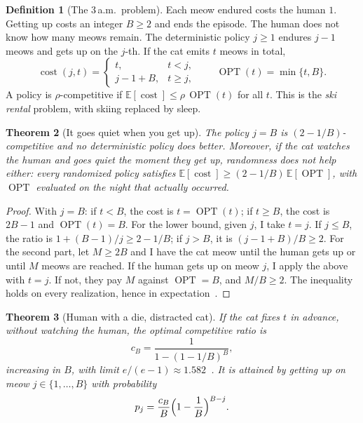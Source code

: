 \documentclass[11pt,a4paper]{article}
\theoremstyle{plain}
\newtheorem{teorema}{Theorem}[section]
\theoremstyle{definition}
\newtheorem{definicion}[teorema]{Definition}
\theoremstyle{remark}
\numberwithin{equation}{section}
\newcommand{\E}{\mathbb{E}}
\newcommand{\costo}{\operatorname{cost}}
\newcommand{\OPT}{\operatorname{OPT}}
\begin{document}
\begin{definicion}[The 3\,a.m.\ problem]
Each meow endured costs the human $1$. Getting up costs an integer $B\ge 2$ and ends the episode. The human does not know how many meows remain. The deterministic policy $j\ge 1$ endures $j-1$ meows and gets up on the $j$-th. If the cat emits $t$ meows in total,
\begin{equation}
  \costo(j,t)=\begin{cases}t, & t<j,\\ j-1+B, & t\ge j,\end{cases}
  \qquad
  \OPT(t)=\min\{t,B\}.
\end{equation}
A policy is $\rho$-competitive if $\E[\costo]\le\rho\,\OPT(t)$ for all $t$. This is the \emph{ski rental} problem, with skiing replaced by sleep.
\end{definicion}

\begin{teorema}[It goes quiet when you get up]\label{teo:adaptativo}
The policy $j=B$ is $(2-1/B)$-competitive and no deterministic policy does better. Moreover, if the cat watches the human and goes quiet the moment they get up, randomness does not help either: every randomized policy satisfies $\E[\costo]\ge(2-1/B)\,\E[\OPT]$, with $\OPT$ evaluated on the night that actually occurred.
\end{teorema}

\begin{proof}
With $j=B$: if $t<B$, the cost is $t=\OPT(t)$; if $t\ge B$, the cost is $2B-1$ and $\OPT(t)=B$. For the lower bound, given $j$, I take $t=j$. If $j\le B$, the ratio is $1+(B-1)/j\ge 2-1/B$; if $j>B$, it is $(j-1+B)/B\ge 2$. For the second part, let $M\ge 2B$ and I have the cat meow until the human gets up or until $M$ meows are reached. If the human gets up on meow $j$, I apply the above with $t=j$. If not, they pay $M$ against $\OPT=B$, and $M/B\ge 2$. The inequality holds on every realization, hence in expectation~\cite{bendavid}.
\end{proof}

\begin{teorema}[Human with a die, distracted cat]\label{teo:dado}
If the cat fixes $t$ in advance, without watching the human, the optimal competitive ratio is
\begin{equation}
  c_B=\frac{1}{1-(1-1/B)^B},
\end{equation}
increasing in $B$, with limit $e/(e-1)\approx 1.582$~\cite{karlin}. It is attained by getting up on meow $j\in\{1,\dots,B\}$ with probability
\begin{equation}
  p_j=\frac{c_B}{B}\Bigl(1-\frac1B\Bigr)^{B-j}.
\end{equation}
\end{teorema}
\end{document}
